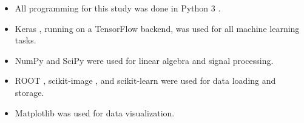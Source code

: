 \documentclass[12pt]{article}
\begin{document}
\begin{itemize}
    \item All programming for this study was done in Python 3 \cite{python}.
    \item Keras \cite{keras}, running on a TensorFlow \cite{tensorflow} backend, was used for all machine learning tasks.
    \item NumPy \cite{numpy} and SciPy \cite{scipy} were used for linear algebra and signal processing.
    \item ROOT \cite{root}, scikit-image \cite{scikit-image}, and scikit-learn \cite{scikit-learn} were used for data loading and storage.
    \item Matplotlib \cite{matplotlib} was used for data visualization.
\end{itemize}
\end{document}
